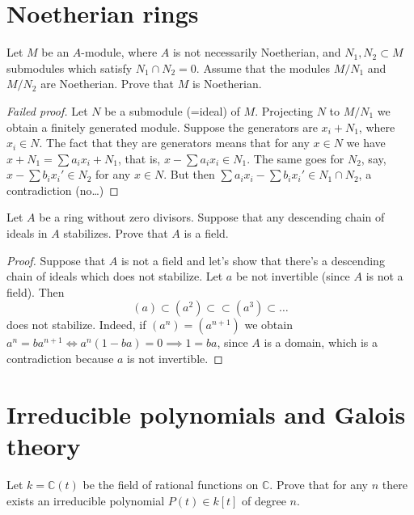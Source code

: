\section{Noetherian rings}

\begin{exercise}
\label{exercise-intersection-submodules-noet}
Let $M$ be an $A$-module, where $A$
is not necessarily Noetherian,
and $N_1,N_2 \subset M$ submodules
which satisfy $N_1 \cap N_2 = 0$.
Assume that the modules $M/N_1$
and $M/N_2$ are Noetherian.
Prove that $M$ is Noetherian.
\end{exercise}

\begin{proof}[Failed proof]
Let $N$ be a submodule (=ideal) of $M$.
Projecting $N$ to $M/N_1$
we obtain a finitely generated module.
Suppose the generators are
$x_i + N_1$, where $x_i \in N$.
The fact that they are generators means
that for any $x \in N$ we have
$x+N_1=\sum a_ix_i + N_1$,
that is, $x-\sum a_ix_i \in N_1$.
The same goes for $N_2$, say,
$x - \sum b_i x_i' \in N_2$ for any
$x \in N$. But then
$\sum a_i x_i - \sum b_i x_i' \in N_1\cap
N_2$, a contradiction (no…)
\end{proof}

\begin{exercise}
\label{exercise-descending-chains-is-field}
Let $A$ be a ring without zero divisors.
Suppose that any descending chain of
ideals in $A$ stabilizes. Prove
that $A$ is a field.
\end{exercise}

\begin{proof}
Suppose that $A$ is not a field
and let's show that there's a descending
chain of ideals which does not stabilize.
Let $a$ be not invertible (since $A$
is not a field).
Then 
$$
(a)\subset (a^2) \subset \subset (a^3)
\subset…
$$
does not stabilize. Indeed,
if $(a^n)=(a^{n+1})$ we obtain
$a^n=ba^{n+1}\iff a^n(1-ba)=0
\implies  1=ba$, since $A$ is a domain,
which is a contradiction because
$a$ is not invertible.
\end{proof}



\section{Irreducible polynomials and Galois
theory}

\begin{exercise}
\label{exercise-rational-functions-irreducible}
Let $k=\mathbb{C}(t)$ be the field of
rational functions on $\mathbb{C}$.
Prove that for any $n$ there exists
an irreducible polynomial
$P(t) \in k[t]$ of degree $n$.
\end{exercise}

